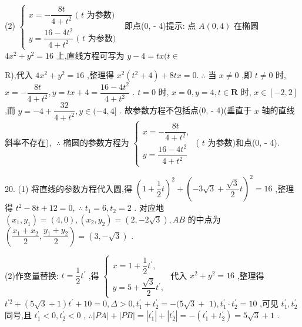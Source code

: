 (2) $\left\{  \begin{array}{l} x =  - \dfrac{8t}{4 + {t}^{2}}\text{ ( }t\text{ 为参数) } \\  y = \dfrac{{16} - 4{t}^{2}}{4 + {t}^{2}}\text{ ( }t\text{ 为参数) } \end{array}\right.$ 即点(0, - 4)提示: 点 $A\left( {0,4}\right)$ 在椭圆 $4{x}^{2} + {y}^{2} = {16}$ 上,直线方程可写为 $y - 4 = {tx}(t \in$

R),代入 $4{x}^{2} + {y}^{2} = {16}$ ,整理得 ${x}^{2}\left( {{t}^{2} + 4}\right)  + {8tx} = 0.\;\therefore$ 当 $x \neq  0$ ,即 $t \neq  0$ 时, $x =  - \dfrac{8t}{4 + {t}^{2}},y = {tx} + 4 = \dfrac{{16} - 4{t}^{2}}{4 + {t}^{2}}$ . $t = 0$ 时, $x = 0,y = 4,t \in  \mathbf{R}$ 时, $x \in  \left\lbrack  {-2,2}\right\rbrack$ ,而 $y =  - 4 + \dfrac{32}{4 + {t}^{2}},y \in  ( - 4,4\rbrack$ . 故参数方程不包括点(0, - 4)(垂直于 $x$ 轴的直线斜率不存在), $\;\therefore$ 椭圆的参数方程为 $\left\{  \begin{array}{l} x =  - \dfrac{8t}{4 + {t}^{2}}, \\  y = \dfrac{{16} - 4{t}^{2}}{4 + {t}^{2}} \end{array}\right.$ ( $t$ 为参数)和点(0, - 4).

20. (1) 将直线的参数方程代入圆,得 ${\left( 1 + \dfrac{1}{2}t\right) }^{2} + {\left( -3\sqrt{3} + \dfrac{\sqrt{3}}{2}t\right) }^{2} = {16}$ ,整理得 ${t}^{2} - {8t} + {12} = 0,\;\therefore \;{t}_{1} = 6,{t}_{2} = 2$ . 对应地 $\left( {{x}_{1},{y}_{1}}\right)  = \left( {4,0}\right) ,\left( {{x}_{2},{y}_{2}}\right)  = \left( {2, - 2\sqrt{3}}\right) ,{AB}$ 的中点为 $\left( {\dfrac{{x}_{1} + {x}_{2}}{2},\dfrac{{y}_{1} + {y}_{2}}{2}}\right)  = \left( {3, - \sqrt{3}}\right)$ .

(2)作变量替换: $t = \dfrac{1}{2}{t}^{\prime }$ ,得 $\left\{  \begin{array}{l} x = 1 + \dfrac{1}{2}{t}^{\prime }, \\  y = 5 + \dfrac{\sqrt{3}}{2}{t}^{\prime }, \end{array}\right.$ 代入 ${x}^{2} + {y}^{2} = {16}$ ,整理得 ${t}^{\prime 2} + \left( {5\sqrt{3} + 1}\right) {t}^{\prime } + {10} = 0,\Delta  > 0,{t}_{1}^{\prime } + {t}_{2}^{\prime } =  - (5\sqrt{3} +$  $1),{t}_{1}^{\prime } \cdot  {t}_{2}^{\prime } = {10}$ ,可见 ${t}_{1}^{\prime },{t}_{2}^{\prime }$ 同号,且 ${t}_{1}^{\prime } < 0,{t}_{2}^{\prime } < 0$ , $\therefore \left| {PA}\right|  + \left| {PB}\right|  = \left| {t}_{1}^{\prime }\right|  + \left| {t}_{2}^{\prime }\right|  =  - \left( {{t}_{1}^{\prime } + {t}_{2}^{\prime }}\right)  = 5\sqrt{3} + 1$ .

